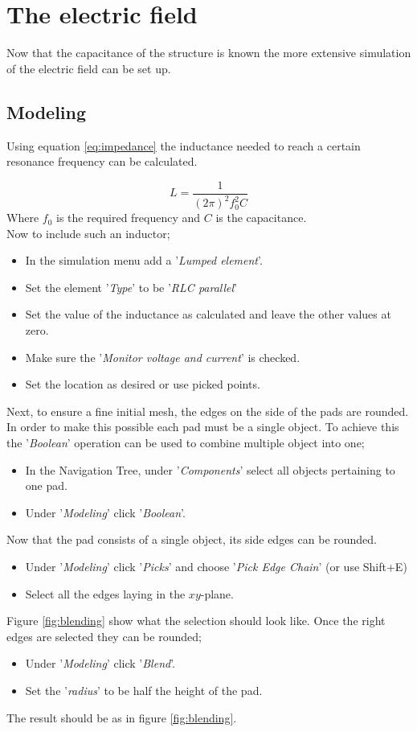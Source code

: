 \section{The electric field}
Now that the capacitance of the structure is known the more extensive simulation of the electric field can be set up.
\subsection{Modeling}
Using equation \eqref{eq:impedance} the inductance needed to reach a certain resonance frequency can be calculated. 

\begin{equation}\label{eq:impedance}
L = \frac{1}{(2\pi)^{2}f_{0}^{2}C}
\end{equation}
Where \(f_{0}\) is the required frequency and \(C\) is the capacitance.\\
Now to include such an inductor;
\begin{itemize}
	\item In the simulation menu add a '\textit{Lumped element}'.
	\item Set the element '\textit{Type}' to be '\textit{RLC parallel}'
	\item Set the value of the inductance as calculated and leave the other values at zero.
	\item Make sure the '\textit{Monitor voltage and current}' is checked.
	\item Set the location as desired or use picked points.
\end{itemize}

Next, to ensure a fine initial mesh, the edges on the side of the pads are rounded. In order to make this possible each pad must be a single object. To achieve this the '\textit{Boolean}' operation can be used to combine multiple object into one;

\begin{itemize}
	\item In the Navigation Tree, under '\textit{Components}' select all objects pertaining to one pad.
	\item Under '\textit{Modeling}' click '\textit{Boolean}'.
\end{itemize}
Now that the pad consists of a single object, its side edges can be rounded.
\begin{itemize}
	\item Under '\textit{Modeling}' click '\textit{Picks}' and choose '\textit{Pick Edge Chain}' (or use Shift+E)
	\item Select all the edges laying in the \(xy\)-plane.
\end{itemize}
Figure \ref{fig:blending} show what the selection should look like. Once the right edges are selected they can be rounded;
\begin{itemize}
	\item Under '\textit{Modeling}' click '\textit{Blend}'.
	\item Set the '\textit{radius}' to be half the height of the pad. 
\end{itemize}
The result should be as in figure \ref{fig:blending}.



